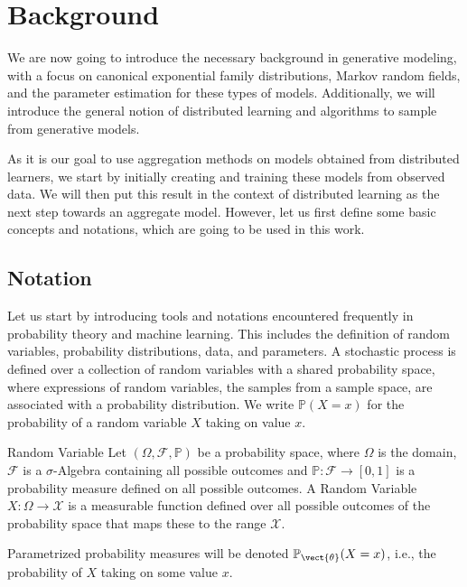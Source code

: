 \chapter{Background}
\label{chapter:kap2}
We are now going to introduce the necessary background in generative modeling, with a focus on canonical exponential family distributions, Markov random fields, and the parameter estimation for these types of models.
Additionally, we will introduce the general notion of distributed learning and algorithms to sample from generative models.

As it is our goal to use aggregation methods on models obtained from distributed learners, we start by initially creating and training these models from observed data. 
We will then put this result in the context of distributed learning as the next step towards an aggregate model.
However, let us first define some basic concepts and notations, which are going to be used in this work.


\section{Notation}
    \label{sec:nota}
    Let us start by introducing tools and notations encountered frequently in probability theory and machine learning.
    This includes the definition of random variables, probability distributions, data, and parameters.
    A stochastic process is defined over a collection of random variables with a shared probability space, where expressions of random variables, the samples from a sample space, are associated with a probability distribution. 
    We write $\mathbb{P}(X = x)$ for the probability of a random variable $X$ taking on value $x$.
    \begin{definition}{Random Variable}
        \label{def:randvar}
        Let $(\Omega, \mathcal{F}, \mathbb{P})$ be a probability space, where $\Omega$ is the domain, $\mathcal{F}$ is a $\sigma$-Algebra containing all possible outcomes and $\mathbb{P}: \mathcal{F} \rightarrow [0,1]$ is a probability measure defined on all possible outcomes.
        A Random Variable $X: \Omega \rightarrow \mathcal{X}$ is a measurable function defined over all possible outcomes of the probability space that maps these to the range $\mathcal{X}$.

        Parametrized probability measures will be denoted $\mathbb{P}_{\vect{\theta}} (X = x)$, i.e., the probability of $X$ taking on some value $x$.
    \end{definition}

